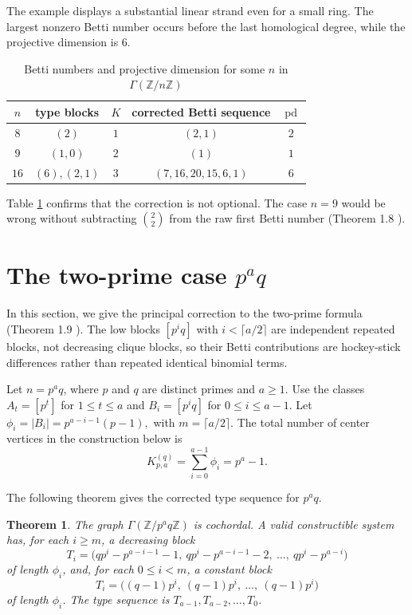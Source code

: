 \documentclass[12pt]{article}
\newtheorem{theorem}{Theorem}[section]
\theoremstyle{definition}
\begin{document}
The example displays a substantial linear strand even for a small ring.  The largest nonzero Betti number occurs before the last homological degree, while the projective dimension is $6$.

\medskip

\begin{table}[H]
	\begin{center}
\begin{tabular}{ccccc}
\toprule
$n$ & type blocks & $K$ & corrected Betti sequence & $\operatorname{pd}$\\
\midrule
$8$ & $(2)$ & $1$ & $(2,1)$ & $2$\\
$9$ & $(1,0)$ & $2$ & $(1)$ & $1$\\
$16$ & $(6),(2,1)$ & $3$ & $(7,16,20,15,6,1)$ & $6$\\
\bottomrule
\end{tabular}
\end{center}
\caption{Betti numbers and projective dimension for some $n$ in $\Gamma(\mathbb{Z}/n\mathbb{Z})$}
\label{tab 3}
\end{table}

\medskip

Table \ref{tab 3} confirms that the correction is not optional.  The case $n=9$ would be wrong without subtracting $\binom{2}{2}$ from the raw first Betti number (Theorem 1.8 \cite{DungVu2026}).
\section{The two-prime case $p^a q$}\label{sec:two-prime}
 In this section, we give the principal correction to the two-prime formula (Theorem 1.9 \cite{DungVu2026}).  The low blocks $[p^i q]$ with $i<\lceil a/2\rceil$ are independent repeated blocks, not decreasing clique blocks, so their Betti contributions are hockey-stick differences rather than repeated identical binomial terms.

\medskip

Let $n=p^a q$, where $p$ and $q$ are distinct primes and $a\geq 1$.  Use the classes $A_t=[p^t]$ for $1\leq t\leq a$ and $B_i=[p^i q]$ for $0\leq i\leq a-1$.  Let 
$ \phi_i=|B_i|=p^{a-i-1}(p-1),$ with $ m=\lceil a/2\rceil. $
The total number of center vertices in the construction below is
$$
K_{p,a}^{(q)}=\sum_{i=0}^{a-1}\phi_i=p^a-1.
$$

\medskip

\noindent The following theorem gives the corrected type sequence for $p^a q$.
\begin{theorem}\label{thm:two-prime-type}
The graph $\Gamma(\mathbb{Z}/p^a q\mathbb{Z})$ is cochordal.  A valid constructible system has, for each $i\geq m$, a decreasing block
$$
T_i=\bigl(qp^i-p^{a-i-1}-1,\ qp^i-p^{a-i-1}-2,\ \ldots,\ qp^i-p^{a-i}\bigr)
$$
of length $\phi_i$, and, for each $0\leq i<m$, a constant block
$$
T_i=\bigl((q-1)p^i,\ (q-1)p^i,\ \ldots,\ (q-1)p^i\bigr)
$$
of length $\phi_i$.  The type sequence is $T_{a-1},T_{a-2},\ldots,T_0$.
\end{theorem}
\end{document}
